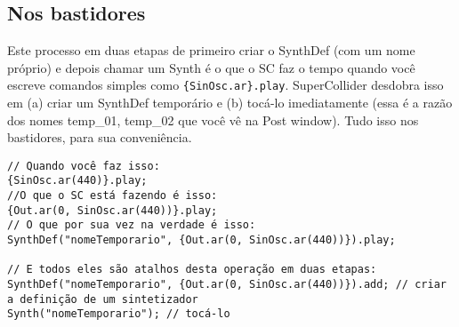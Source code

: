 \subsection{Nos bastidores}

Este processo em duas etapas de primeiro criar o SynthDef (com um nome próprio) e depois chamar um Synth é o que o SC faz o tempo quando você escreve comandos simples como \texttt{\{SinOsc.ar\}.play}. SuperCollider desdobra isso em (a) criar um SynthDef temporário e (b) tocá-lo imediatamente (essa é a razão dos nomes temp\_01, temp\_02 que você vê na Post window). Tudo isso nos bastidores, para sua conveniência.
 
\begin{lstlisting}[style=SuperCollider-IDE, basicstyle=\scttfamily\footnotesize]
// Quando você faz isso:
{SinOsc.ar(440)}.play;
//O que o SC está fazendo é isso:
{Out.ar(0, SinOsc.ar(440))}.play;
// O que por sua vez na verdade é isso:
SynthDef("nomeTemporario", {Out.ar(0, SinOsc.ar(440))}).play;

// E todos eles são atalhos desta operação em duas etapas:
SynthDef("nomeTemporario", {Out.ar(0, SinOsc.ar(440))}).add; // criar a definição de um sintetizador
Synth("nomeTemporario"); // tocá-lo
\end{lstlisting}
